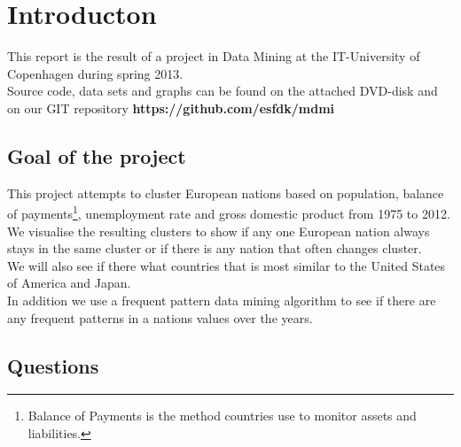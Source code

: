 \chapter{Introducton}
\label{Intro}
This report is the result of a project in Data Mining at the IT-University of Copenhagen during spring 2013.
\\Source code, data sets and graphs can be found on the attached DVD-disk and on our GIT repository \textbf{https://github.com/esfdk/mdmi}


\section{Goal of the project}
This project attempts to cluster European nations based on population, balance of payments\footnote{Balance of Payments is the method countries use to monitor assets and liabilities.\cite[What Is Balance Of Payments?]{Investopedia}}, unemployment rate and gross domestic product from 1975 to 2012. We visualise the resulting clusters to show if any one European nation always stays in the same cluster or if there is any nation that often changes cluster.
\\We will also see if there what countries that is most similar to the United States of America and Japan.
\\In addition we use a frequent pattern data mining algorithm to see if there are any frequent patterns in a nations values over the years.

\section{Questions}